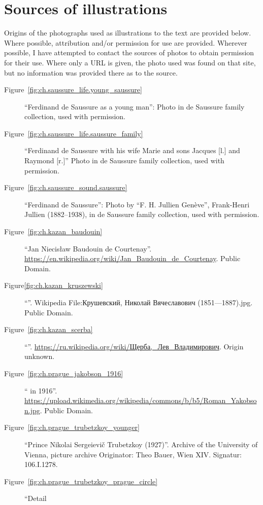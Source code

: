 \addchap{\lsAcknowledgementTitle} 


\section*{Sources of illustrations}

Origins of the photographs used as illustrations to the text are
provided below. Where possible, attribution and/or permission for use
are provided. Wherever possible, I have attempted to contact the
sources of photos to obtain permission for their use. Where only a URL
is given, the photo used was found on that site, but no information
was provided there as to the source.

\begin{description}
\item[Figure~\ref{fig:ch.saussure_life.young_saussure}] ``Ferdinand de
  Saussure as a young man'': Photo in de Saussure family collection,
  used with permission. 
\item[Figure~\ref{fig:ch.saussure_life.saussure_family}] ``Ferdinand
  de Saussure with his wife Marie and sons Jacques [l.]  and Raymond
  [r.]'' Photo in de Saussure family collection, used with permission.
\item[Figure~\ref{fig:ch.saussure_sound.saussure}] ``Ferdinand de
  Saussure'': Photo by ``F. H. Jullien Genève'', Frank-Henri Jullien
  (1882–1938), in de Saussure family collection, used with permission.
\item[Figure~\ref{fig:ch.kazan_baudouin}] ``Jan Niecisław Baudouin de
  Courtenay''.
  \url{https://en.wikipedia.org/wiki/Jan_Baudouin_de_Courtenay}. Public
  Domain.
\item[Figure\ref{fig:ch.kazan_kruszewski}] ``''.
  Wikipedia File:Крушевский, Николай Вячеславович
  (1851—1887).jpg. Public Domain.
\item[Figure~\ref{fig:ch.kazan_scerba}] ``''.
  \url{https://ru.wikipedia.org/wiki/Щерба,_Лев_Владимирович}. Origin
  unknown.
\item[Figure~\ref{fig:ch.prague_jakobson_1916}] `` in
  1916''.
  \url{https://upload.wikimedia.org/wikipedia/commons/b/b5/Roman_Yakobson.jpg}.
  Public Domain.
\item[Figure~\ref{fig:ch.prague_trubetzkoy_younger}] ``Prince Nikolai
  Sergeievič Trubetzkoy (1927)''. 
  Archive of the University of Vienna, picture archive Originator:
  Theo Bauer, Wien XIV. Signatur: 106.I.1278. 
\item[Figure~\ref{fig:ch.prague_trubetzkoy_prague_circle}] ``Detail

\end{description}
